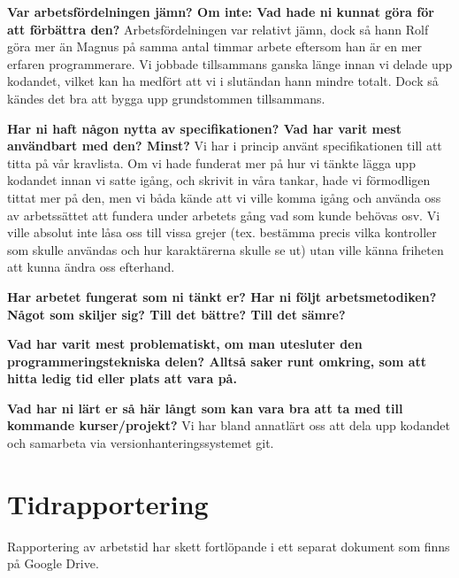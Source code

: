 \documentclass{scrartcl}
\begin{document}
\textbf{Var arbetsfördelningen jämn? Om inte: Vad hade ni kunnat göra för att förbättra den?}
Arbetsfördelningen var relativt jämn, dock så hann Rolf göra mer än Magnus på samma antal timmar arbete eftersom han är en mer erfaren programmerare. Vi jobbade tillsammans ganska länge innan vi delade upp kodandet, vilket kan ha medfört att vi i slutändan hann mindre totalt. Dock så kändes det bra att bygga upp grundstommen tillsammans. 

\textbf{Har ni haft någon nytta av specifikationen? Vad har varit mest användbart med den? Minst?}
Vi har i princip använt specifikationen till att titta på vår kravlista. Om vi hade funderat mer på hur vi tänkte lägga upp kodandet innan vi satte igång, och skrivit in våra tankar, hade vi förmodligen tittat mer på den, men vi båda kände att vi ville komma igång och använda oss av arbetssättet att fundera under arbetets gång vad som kunde behövas osv. Vi ville absolut inte låsa oss till vissa grejer (tex. bestämma precis vilka kontroller som skulle användas och hur karaktärerna skulle se ut) utan ville känna friheten att kunna ändra oss efterhand. 

\textbf{Har arbetet fungerat som ni tänkt er? Har ni följt arbetsmetodiken? Något som skiljer sig? Till det bättre? Till det sämre?}



\textbf{Vad har varit mest problematiskt, om man utesluter den programmeringstekniska delen? Alltså saker runt omkring, som att hitta ledig tid eller plats att vara på.}

\textbf{Vad har ni lärt er så här långt som kan vara bra att ta med till kommande kurser/projekt?} Vi har bland annatlärt oss att dela upp kodandet och samarbeta via versionhanteringssystemet git.

\section{Tidrapportering}
Rapportering av arbetstid har skett fortlöpande i ett separat dokument som finns på Google Drive.
\end{document}

